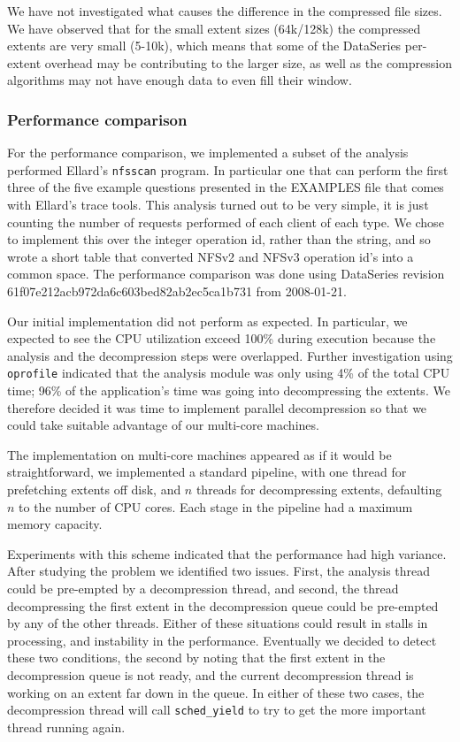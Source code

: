 We have not investigated what causes the difference in the compressed
file sizes.  We have observed that for the small extent sizes
(64k/128k) the compressed extents are very small (5-10k), which means
that some of the DataSeries per-extent overhead may be contributing to
the larger size, as well as the compression algorithms may not have
enough data to even fill their window.

\subsubsection{Performance comparison}

For the performance comparison, we implemented a subset of the
analysis performed Ellard's \texttt{nfsscan} program. In particular one
that can perform the first three of the five example questions
presented in the EXAMPLES file that comes with Ellard's trace tools.
This analysis turned out to be very simple, it is just counting the
number of requests performed of each client of each type.  We chose to
implement this over the integer operation id, rather than the string,
and so wrote a short table that converted NFSv2 and NFSv3 operation
id's into a common space. The performance comparison was done using
DataSeries revision 61f07e212acb972da6c603bed82ab2ec5ca1b731 from
2008-01-21.

Our initial implementation did not perform as expected.  In particular,
we expected to see
the CPU utilization exceed 100\% during execution because the
analysis and the decompression steps were overlapped.  Further
investigation using \texttt{oprofile} indicated that the analysis module was
only using 4\% of the total CPU time; 96\% of the application's time
was going into decompressing the extents.  We therefore decided it was
time to implement parallel decompression so that we could take
suitable advantage of our multi-core machines.

The implementation on multi-core machines appeared as if it would be
straightforward, we implemented a standard pipeline, with one thread for
prefetching extents off disk, and $n$ threads for decompressing
extents, defaulting $n$ to the number of CPU cores.  Each stage in the
pipeline had a maximum memory capacity.

Experiments with this scheme indicated that the performance had high
variance.  After studying the problem we identified two issues.
First, the analysis thread could be pre-empted by a decompression
thread, and second, the thread decompressing the first extent in the
decompression queue could be pre-empted by any of the other threads.
Either of these situations could result in stalls in processing, and
instability in the performance.  Eventually we decided to detect
these two conditions, the second by noting that the first extent in
the decompression queue is not ready, and the current decompression
thread is working on an extent far down in the queue.  In either of
these two cases, the decompression thread will call \texttt{sched\_yield} to
try to get the more important thread running again.

